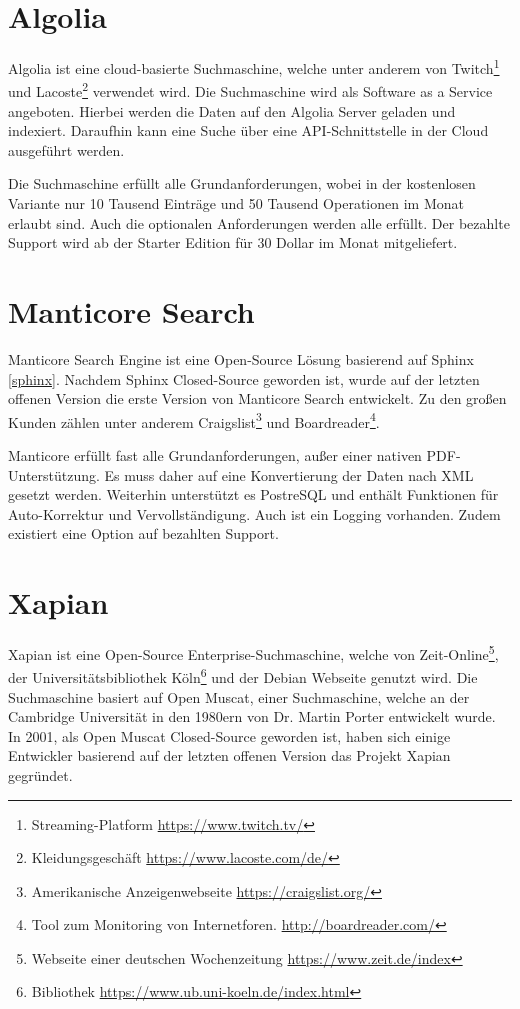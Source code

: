 \section{Algolia}
\label{algolia}

Algolia ist eine cloud-basierte Suchmaschine, welche unter anderem von Twitch\footnote{Streaming-Platform \url{https://www.twitch.tv/}} und Lacoste\footnote{Kleidungsgeschäft \url{https://www.lacoste.com/de/}} verwendet wird. Die Suchmaschine wird als Software as a Service angeboten. Hierbei werden die Daten auf den Algolia Server geladen und indexiert. Daraufhin kann eine Suche über eine API-Schnittstelle in der Cloud ausgeführt werden.

Die Suchmaschine erfüllt alle Grundanforderungen, wobei in der kostenlosen Variante nur 10 Tausend Einträge und 50 Tausend Operationen im Monat erlaubt sind. Auch die optionalen Anforderungen werden alle erfüllt. Der bezahlte Support wird ab der Starter Edition für 30 Dollar im Monat mitgeliefert. \cite{Algolia.2019}

\section{Manticore Search}
\label{manticore}

Manticore Search Engine ist eine Open-Source Lösung basierend auf Sphinx \ref{sphinx}. Nachdem Sphinx Closed-Source geworden ist, wurde auf der letzten offenen Version die erste Version von Manticore Search entwickelt. Zu den großen Kunden zählen unter anderem Craigslist\footnote{Amerikanische Anzeigenwebseite \url{https://craigslist.org/}} und Boardreader\footnote{Tool zum Monitoring von Internetforen. \url{http://boardreader.com/}}.

Manticore erfüllt fast alle Grundanforderungen, außer einer nativen PDF-Unterstützung. Es muss daher auf eine Konvertierung der Daten nach XML gesetzt werden. Weiterhin unterstützt es PostreSQL und enthält Funktionen für Auto-Korrektur und Vervollständigung. Auch ist ein Logging vorhanden. Zudem existiert eine Option auf bezahlten Support. \cite{ManticoreSoftwareLtd.2019}

\section{Xapian}
\label{xapian}

Xapian ist eine Open-Source Enterprise-Suchmaschine, welche von Zeit-Online\footnote{Webseite einer deutschen Wochenzeitung \url{https://www.zeit.de/index}}, der Universitätsbibliothek Köln\footnote{Bibliothek \url{https://www.ub.uni-koeln.de/index.html}} und der Debian Webseite genutzt wird. Die Suchmaschine basiert auf Open Muscat, einer Suchmaschine, welche an der Cambridge Universität in den 1980ern von Dr. Martin Porter entwickelt wurde. In 2001, als Open Muscat Closed-Source geworden ist, haben sich einige Entwickler basierend auf der letzten offenen Version das Projekt Xapian gegründet.

